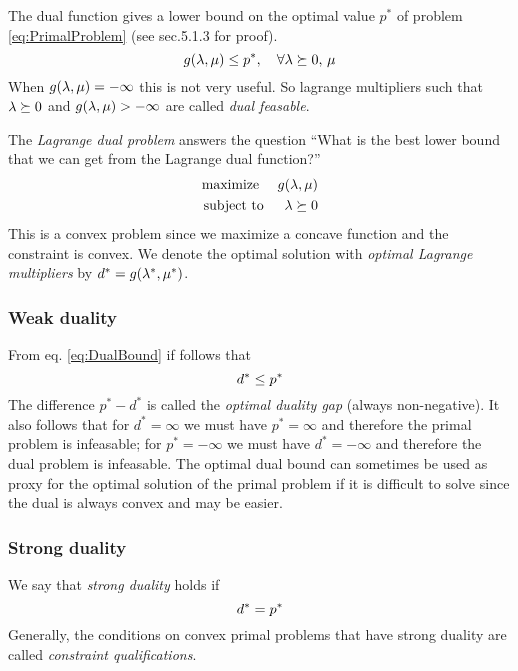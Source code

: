 The dual function gives a lower bound on the optimal value $p^*$ of problem \eqref{eq:PrimalProblem} (see \cite{Boyd2004} sec.5.1.3 for proof).
\begin{equation}\label{eq:DualBound}
 g(\mathbf{\lambda},\mathbf{\mu}) \leq p^*, \quad \forall \mathbf{\lambda} \succeq 0, \, \mu
\end{equation}
When $g(\mathbf{\lambda},\mathbf{\mu}) = - \infty$ this is not very useful.
So lagrange multipliers such that $\mathbf{\lambda} \succeq 0$ and $g(\mathbf{\lambda},\mathbf{\mu}) > - \infty$ are called \emph{dual feasable}.

The \emph{Lagrange dual problem} answers the question ``What is the best lower bound that we can get from the Lagrange dual function?''
\begin{eqnarray}\label{eq:DualProblem}
  \text{maximize }  & & g(\mathbf{\lambda},\mathbf{\mu}) \nonumber \\
  \text{subject to} & & \mathbf{\lambda} \succeq 0 
\end{eqnarray}
This is a convex problem since we maximize a concave function and the constraint is convex. We denote the optimal solution with \emph{optimal Lagrange multipliers} by $d^* = g(\mathbf{\lambda}^*,\mathbf{\mu}^*)$.

\subsubsection{Weak duality}\label{sec:WeakDuality}
From eq. \eqref{eq:DualBound} if follows that 
\begin{equation}\label{eq:WeakDuality}\index{Weak duality}
d^* \leq p^* 
\end{equation}
The difference $p^*-d^*$ is called the \emph{optimal duality gap} (always non-negative).
It also follows that for $d^* = \infty$ we must have $p^* = \infty$ and therefore the primal problem is infeasable; for $p^* = -\infty$ we must have $d^* = -\infty$ and therefore the dual problem is infeasable.
The optimal dual bound can sometimes be used as proxy for the optimal solution of the primal problem if it is difficult to solve since the dual is always convex and may be easier.

\subsubsection{Strong duality}\label{sec:StrongDuality}
We say that \emph{strong duality} holds if 
\begin{equation}\label{eq:StrongDuality}\index{Strong duality}
d^* = p^* 
\end{equation}
Generally, the conditions on convex primal problems that have strong duality are called \emph{constraint qualifications}.

